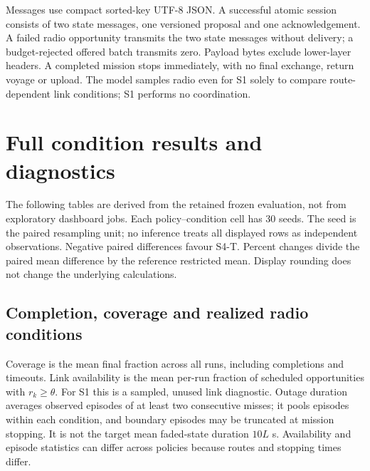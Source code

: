Messages use compact sorted-key UTF-8 JSON. A successful atomic session consists of two state messages, one versioned proposal and one acknowledgement. A failed radio opportunity transmits the two state messages without delivery; a budget-rejected offered batch transmits zero. Payload bytes exclude lower-layer headers. A completed mission stops immediately, with no final exchange, return voyage or upload. The model samples radio even for S1 solely to compare route-dependent link conditions; S1 performs no coordination.

\clearpage
\section{Full condition results and diagnostics}\label{app:condition-results}
The following tables are derived from the retained frozen evaluation, not from exploratory dashboard jobs. Each policy--condition cell has 30 seeds. The seed is the paired resampling unit; no inference treats all displayed rows as independent observations. Negative paired differences favour S4-T. Percent changes divide the paired mean difference by the reference restricted mean. Display rounding does not change the underlying calculations.

\begin{table}[htbp]\centering
\caption{Restricted mean time in seconds for all five policies. Incomplete missions contribute the common $7200$ s timeout.}

\end{table}

\begin{table}[htbp]\centering
\caption{All pre-specified paired contrasts. The S2 comparison is primary; S3 and S4-P are secondary. Intervals are marginal 95\% paired-bootstrap intervals, not simultaneous intervals.}

\end{table}

\clearpage
\subsection{Completion, coverage and realized radio conditions}
Coverage is the mean final fraction across all runs, including completions and timeouts. Link availability is the mean per-run fraction of scheduled opportunities with $r_k\geq\theta$. For S1 this is a sampled, unused link diagnostic. Outage duration averages observed episodes of at least two consecutive misses; it pools episodes within each condition, and boundary episodes may be truncated at mission stopping. It is not the target mean faded-state duration $10L$ s. Availability and episode statistics can differ across policies because routes and stopping times differ.


